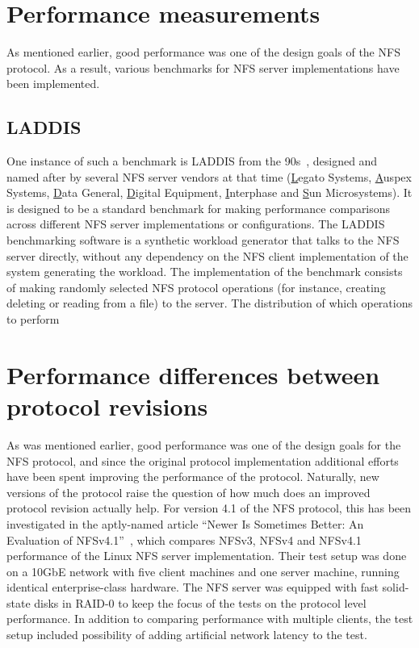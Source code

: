 \section{Performance measurements}

As mentioned earlier, good performance was one of the design goals of the NFS protocol.
As a result, various benchmarks for NFS server implementations have been implemented.

\subsection{LADDIS}
One instance of such a benchmark is LADDIS from the 90s~\cite{LADDIS}, designed and named after by
several NFS server vendors at that time (\underline{L}egato Systems, \underline{A}uspex Systems, \underline{D}ata General,
\underline{D}igital Equipment, \underline{I}nterphase and \underline{S}un Microsystems).
It is designed to be a standard benchmark for making performance comparisons across different NFS server implementations
or configurations.
The LADDIS benchmarking software is a synthetic workload generator that talks to the NFS server directly,
without any dependency on the NFS client implementation of the system generating the workload.
The implementation of the benchmark consists of making randomly selected NFS protocol operations
(for instance, creating deleting or reading from a file)
to the server.
The distribution of which operations to perform

\section{Performance differences between protocol revisions} \label{sect:NFSv41}

As was mentioned earlier, good performance was one of the design goals for the NFS protocol,
and since the original protocol implementation additional efforts have been spent improving the performance of the protocol.
Naturally, new versions of the protocol raise the question of how much does an improved protocol revision actually help.
For version 4.1 of the NFS protocol, this has been investigated in the aptly-named article ``Newer Is Sometimes Better: An Evaluation of NFSv4.1''~\cite{NFSv4Better}, which compares NFSv3, NFSv4 and NFSv4.1 performance of the Linux NFS server implementation.
Their test setup was done on a 10GbE network with five client machines and one server machine, running identical enterprise-class hardware.
The NFS server was equipped with fast solid-state disks in RAID-0 to keep the focus of the tests on the protocol level performance.
In addition to comparing performance with multiple clients, the test setup included possibility of adding artificial network latency to the test.

